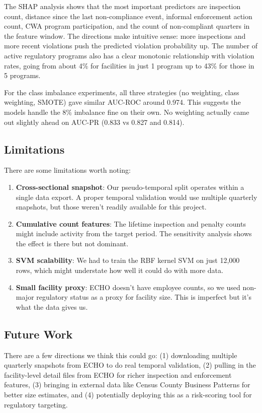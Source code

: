 \documentclass[11pt]{article}
\begin{document}
The SHAP analysis shows that the most important predictors are inspection count, distance since the last non-compliance event, informal enforcement action count, CWA program participation, and the count of non-compliant quarters in the feature window. The directions make intuitive sense: more inspections and more recent violations push the predicted violation probability up. The number of active regulatory programs also has a clear monotonic relationship with violation rates, going from about 4\% for facilities in just 1 program up to 43\% for those in 5 programs.

For the class imbalance experiments, all three strategies (no weighting, class weighting, SMOTE) gave similar AUC-ROC around 0.974. This suggests the models handle the 8\% imbalance fine on their own. No weighting actually came out slightly ahead on AUC-PR (0.833 vs 0.827 and 0.814).

\subsection{Limitations}

There are some limitations worth noting:

\begin{enumerate}
    \item \textbf{Cross-sectional snapshot}: Our pseudo-temporal split operates within a single data export. A proper temporal validation would use multiple quarterly snapshots, but those weren't readily available for this project.
    \item \textbf{Cumulative count features}: The lifetime inspection and penalty counts might include activity from the target period. The sensitivity analysis shows the effect is there but not dominant.
    \item \textbf{SVM scalability}: We had to train the RBF kernel SVM on just 12,000 rows, which might understate how well it could do with more data.
    \item \textbf{Small facility proxy}: ECHO doesn't have employee counts, so we used non-major regulatory status as a proxy for facility size. This is imperfect but it's what the data gives us.
\end{enumerate}

\subsection{Future Work}

There are a few directions we think this could go: (1) downloading multiple quarterly snapshots from ECHO to do real temporal validation, (2) pulling in the facility-level detail files from ECHO for richer inspection and enforcement features, (3) bringing in external data like Census County Business Patterns for better size estimates, and (4) potentially deploying this as a risk-scoring tool for regulatory targeting.
\end{document}
